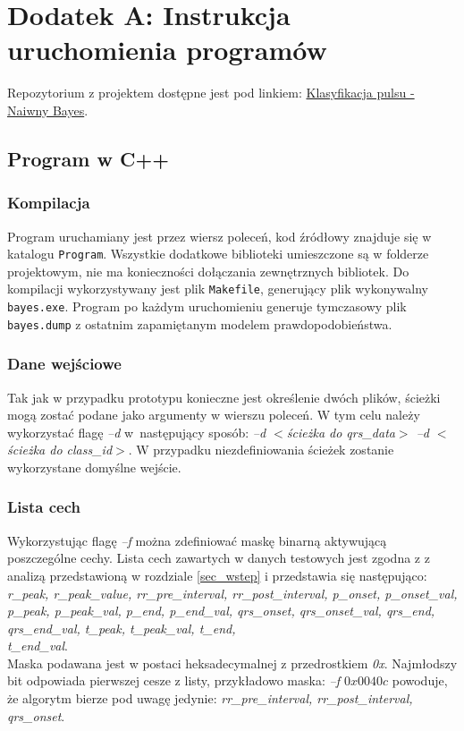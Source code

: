\section{Dodatek A: Instrukcja uruchomienia programów}
\label{dodatekA}

Repozytorium z projektem dostępne jest pod linkiem: \href{https://github.com/kamilfocus/ESDMiT-Naive-Bayes}{Klasyfikacja pulsu - Naiwny Bayes}. 

\subsection{Program w C++}
\label{subsec_cpp_instr}

\subsubsection{Kompilacja}
Program uruchamiany jest przez wiersz poleceń, kod źródłowy znajduje się w katalogu \texttt{Program}. Wszystkie dodatkowe biblioteki umieszczone są w folderze projektowym, nie ma konieczności dołączania zewnętrznych bibliotek. Do kompilacji wykorzystywany jest plik \texttt{Makefile}, generujący plik wykonywalny \texttt{bayes.exe}. Program po każdym uruchomieniu generuje tymczasowy plik \texttt{bayes.dump} z ostatnim zapamiętanym modelem prawdopodobieństwa. 

\subsubsection{Dane wejściowe}
Tak jak w przypadku prototypu konieczne jest określenie dwóch plików, ścieżki mogą zostać podane jako argumenty w wierszu poleceń. W tym celu należy wykorzystać flagę \textit{--d} w~następujący sposób: \textit{--d $<$ścieżka do qrs\_data$>$ --d $<$ścieżka do class\_id$>$}. W przypadku niezdefiniowania ścieżek zostanie wykorzystane domyślne wejście.

\subsubsection{Lista cech}
Wykorzystując flagę \textit{--f} można zdefiniować maskę binarną aktywującą poszczególne cechy. Lista cech zawartych w danych testowych jest zgodna z z analizą przedstawioną w rozdziale \ref{sec_wstep} i przedstawia się następująco:\\
\textit{r\_peak, r\_peak\_value, rr\_pre\_interval, rr\_post\_interval, 
p\_onset, p\_onset\_val, p\_peak, p\_peak\_val, p\_end, p\_end\_val, 
qrs\_onset, qrs\_onset\_val, qrs\_end, qrs\_end\_val, t\_peak, t\_peak\_val, 
t\_end, \\t\_end\_val}.\\
Maska podawana jest w postaci heksadecymalnej z przedrostkiem \textit{0x}. Najmłodszy bit odpowiada pierwszej cesze z listy, przykładowo maska: \textit{--f $0x0040c$} powoduje, że algorytm bierze pod uwagę jedynie: \textit{rr\_pre\_interval, rr\_post\_interval, qrs\_onset}.

